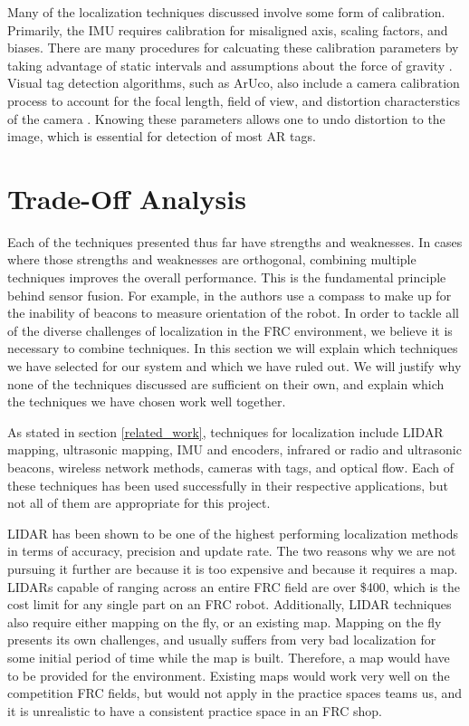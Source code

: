 \documentclass{article}
\begin{document}
  Many of the localization techniques discussed involve some form of calibration. Primarily, the IMU requires calibration for misaligned axis, scaling factors, and biases. There are many procedures for calcuating these calibration parameters by taking advantage of static intervals and assumptions about the force of gravity \cite{lupton_visual-inertial-aided_2012}\cite{lee_test_2011}\cite{tedaldi_robust_2014}. Visual tag detection algorithms, such as ArUco, also include a camera calibration process to account for the focal length, field of view, and distortion characterstics of the camera \cite{noauthor_opencv:_2017}. Knowing these parameters allows one to undo distortion to the image, which is essential for detection of most AR tags.

\section{Trade-Off Analysis} \label{methods}

  Each of the techniques presented thus far have strengths and weaknesses. In cases where those strengths and weaknesses are orthogonal, combining multiple techniques improves the overall performance. This is the fundamental principle behind sensor fusion. For example, in \cite{kim_advanced_2008} the authors use a compass to make up for the inability of beacons to measure orientation of the robot. In order to tackle all of the diverse challenges of localization in the FRC environment, we believe it is necessary to combine techniques. In this section we will explain which techniques we have selected for our system and which we have ruled out. We will justify why none of the techniques discussed are sufficient on their own, and explain which the techniques we have chosen work well together.

  As stated in section \ref{related_work}, techniques for localization include LIDAR mapping, ultrasonic mapping, IMU and encoders, infrared or radio and ultrasonic beacons, wireless network methods, cameras with tags, and optical flow. Each of these techniques has been used successfully in their respective applications, but not all of them are appropriate for this project.

  LIDAR has been shown to be one of the highest performing localization methods in terms of accuracy, precision and update rate. The two reasons why we are not pursuing it further are because it is too expensive and because it requires a map. LIDARs capable of ranging across an entire FRC field are over \$400, which is the cost limit for any single part on an FRC robot. Additionally, LIDAR techniques also require either mapping on the fly, or an existing map. Mapping on the fly presents its own challenges, and usually suffers from very bad localization for some initial period of time while the map is built. Therefore, a map would have to be provided for the environment. Existing maps would work very well on the competition FRC fields, but would not apply in the practice spaces teams us, and it is unrealistic to have a consistent practice space in an FRC shop.
\end{document}
